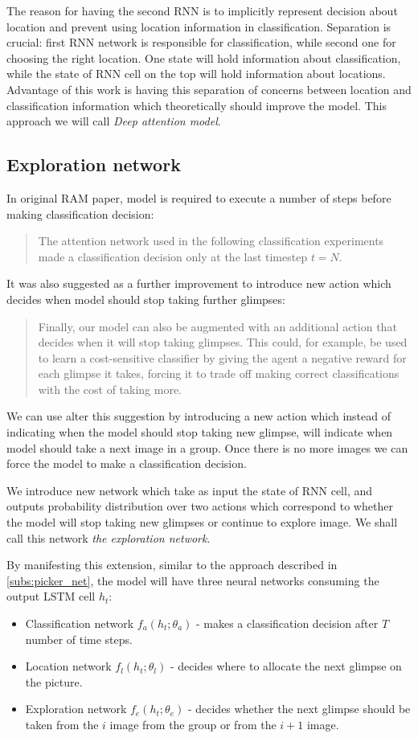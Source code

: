 {The reason for having the second RNN is to implicitly
represent decision about location and
prevent using location information in classification. Separation is crucial:
first RNN network is responsible for
classification, while second one for choosing the right location.
One state will hold information about classification, while the state of
RNN cell on the top will hold information about locations.
Advantage of this work is having this separation of concerns between
location and classification information which theoretically should improve the model.
This approach we will call \emph{Deep attention model}.

\subsection{Exploration network}
In original RAM paper, model is required to execute a number of
steps before making classification decision:
\blockquote{
The attention network used in the following classification experiments made
a classification decision only at the last timestep $t = N$.
}\cite{DBLP:journals/corr/MnihHGK14}
It was also suggested as a further improvement to introduce new action
which decides when model should stop taking further glimpses:
\blockquote{
Finally, our model can also be augmented with an additional action that decides
when it will stop taking glimpses. This could, for example, be used to learn a
cost-sensitive classifier by giving the agent a negative reward for each glimpse
it takes, forcing it to trade off making correct classifications with the cost of
taking more. \cite{DBLP:journals/corr/MnihHGK14}
}

We can use alter this suggestion by introducing a new action which
instead of indicating when the model should stop taking new glimpse, will
indicate when model should take a next image in a group. Once there is no more images
we can force the model to make a classification decision.

We introduce new network which take as input the state of RNN cell, and outputs
probability distribution over two actions which correspond to whether the model
will stop taking new glimpses
or continue to explore image.
We shall call this network \emph{the exploration network}.

By manifesting
this extension, similar to the approach described in \autoref{subs:picker_net},
the model will have three neural networks consuming
the output LSTM cell $h_t$:
\begin{itemize}
	\item Classification network $f_a(h_t; \theta_a)$ - makes a classification
		decision after $T$ number of time steps.
	\item Location network $f_l(h_t; \theta_l)$ - decides where to allocate the next glimpse
	on the picture.
	\item Exploration network $f_e(h_t; \theta_e)$ - decides whether the next glimpse
	should be taken
	from the $i$ image from the group or from the $i+1$ image.
\end{itemize}

}

